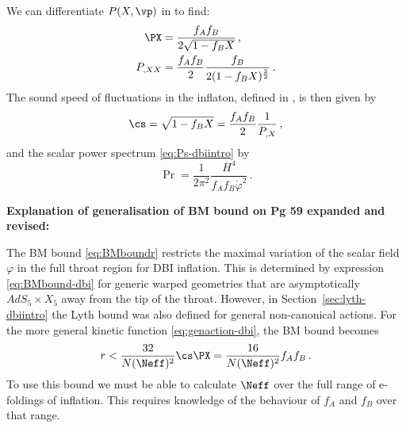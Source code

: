 % 
% 

We can differentiate $P(X, \vp)$ in  to find:
% 
\begin{align}
 \PX &= \frac{f_A f_B}{2\sqrt{1-f_B X}} \,, \\
 P_{,XX} &= \frac{f_A f_B}{2}\frac{f_B}{2(1-f_B X)^{\frac{3}{2}}} \,.
\end{align}
% 
% 
The sound speed of fluctuations in 
the inflaton, defined in , is then given by
%  
\begin{equation}
\label{eq:cs-corr}
\cs = \sqrt{1-f_B X} = \frac{f_Af_B}{2} \frac{1}{P_{,X}}  \,,
\end{equation}
% 
and the scalar power spectrum \eqref{eq:Ps-dbiintro} by
% 
\begin{equation}
\label{eq:spectrum-corr}
\Pr = \frac{1}{2\pi^2}\frac{H^4}{f_Af_B\dot{\varphi}^2}  \,.
\end{equation}

\textbf{Explanation of generalisation of BM bound on Pg 59 expanded and revised:}

The BM bound \eqref{eq:BMboundr} restricts the maximal 
variation of the scalar field $\varphi$ in the full throat region for DBI inflation. 
This is determined by expression \eqref{eq:BMbound-dbi} 
for generic warped geometries that are asymptotically 
$AdS_5 \times X_5$ away from the tip of the throat. However, in Section~\ref{sec:lyth-dbiintro} the
Lyth bound was also defined for general
non-canonical actions. For the more general kinetic function
\eqref{eq:genaction-dbi}, the BM bound becomes
% 
\begin{equation}
\label{eq:bmboundgen-corr}
 r < \frac{32}{N(\Neff)^2}\cs\PX = \frac{16}{N(\Neff)^2}f_A f_B \,.
\end{equation}
% 
To use this bound we must be able to calculate $\Neff$ over the full range of e-foldings of
inflation. This requires knowledge of the behaviour of $f_A$ and $f_B$ over that range. 

